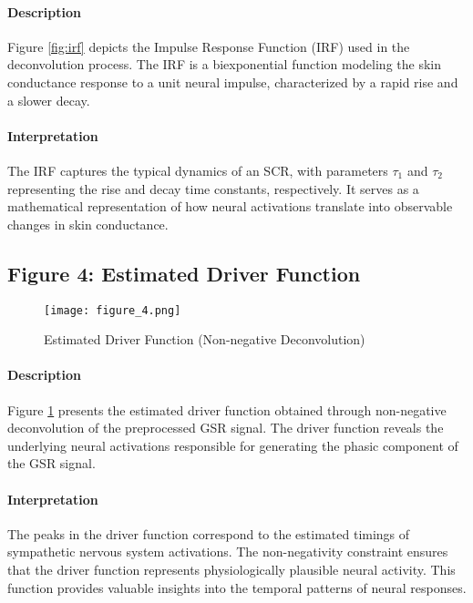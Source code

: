 \documentclass[twocolumn]{article}
\begin{document}
\paragraph{Description}

Figure \ref{fig:irf} depicts the Impulse Response Function (IRF) used in the deconvolution process. The IRF is a biexponential function modeling the skin conductance response to a unit neural impulse, characterized by a rapid rise and a slower decay.

\paragraph{Interpretation}

The IRF captures the typical dynamics of an SCR, with parameters $\tau_1$ and $\tau_2$ representing the rise and decay time constants, respectively. It serves as a mathematical representation of how neural activations translate into observable changes in skin conductance.

\subsection*{Figure 4: Estimated Driver Function}

\begin{figure}[H]
\centering
\texttt{[image: figure\_4.png]}
\caption{Estimated Driver Function (Non-negative Deconvolution)}
\label{fig:driver_function}
\end{figure}

\paragraph{Description}

Figure \ref{fig:driver_function} presents the estimated driver function obtained through non-negative deconvolution of the preprocessed GSR signal. The driver function reveals the underlying neural activations responsible for generating the phasic component of the GSR signal.


\paragraph{Interpretation}

The peaks in the driver function correspond to the estimated timings of sympathetic nervous system activations. The non-negativity constraint ensures that the driver function represents physiologically plausible neural activity. This function provides valuable insights into the temporal patterns of neural responses.
\end{document}
